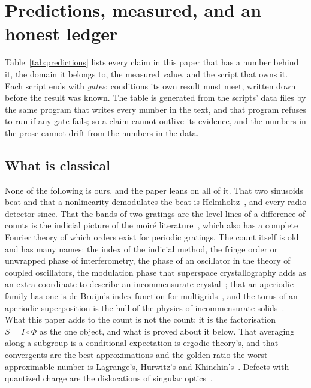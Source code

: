 \section{Predictions, measured, and an honest ledger}
\label{sec:ledger}

Table~\ref{tab:predictions} lists every claim in this paper that has a
number behind it, the domain it belongs to, the measured value, and the
script that owns it. Each script ends with \emph{gates}: conditions its
own result must meet, written down before the result was known. The table
is generated from the scripts' data files by the same program that writes
every number in the text, and that program refuses to run if any gate
fails; so a claim cannot outlive its evidence, and the numbers in the prose
cannot drift from the numbers in the data.

\begin{table}[t]
  \centering\small
  
  \caption{ ``Any'' means the
  claim is about pictures on a torus and holds for drawings, sounds and
  anything else that counts; ``drawing'', ``sound'' and ``a strobe'' are the
  domains in which it was measured, on drawn strokes, on a model ear, and on
  sampled frames; ``a camera'' is the long exposure; ``instrument''
  certifies the tool. No claim without a number; no number without a
  script.}
  \label{tab:predictions}
\end{table}

\subsection{What is classical}
None of the following is ours, and the paper leans on all of it. That two
sinusoids beat and that a nonlinearity demodulates the beat is
Helmholtz~\cite{Helmholtz1954Sensations}, and every radio detector since.
That the bands of two gratings are the level lines of a difference of
counts is the indicial picture of the moir\'e
literature~\cite{Oster1964, Amidror2009Theory}, which also has a complete
Fourier theory of which orders exist for periodic gratings. The count itself
is old and has many names: the index of the indicial method, the fringe
order or unwrapped phase of interferometry, the phase of an oscillator in
the theory of coupled oscillators, the modulation phase that superspace
crystallography adds as an extra coordinate to describe an incommensurate
crystal~\cite{deWolff1974Modulated}; that an aperiodic family has one is
de Bruijn's index function for multigrids~\cite{deBruijn1981Penrose}, and
the torus of an aperiodic superposition is the hull of the physics of
incommensurate solids~\cite{Bellissard2000Hulls}. What this paper adds
to the count is not the count: it is the factorisation $S=I\circ\Phi$ as
the one object, and what is proved about it below. That averaging along a subgroup is a
conditional expectation is ergodic theory's, and that convergents are the
best approximations and the golden ratio the worst approximable number is
Lagrange's, Hurwitz's and Khinchin's~\cite{Hurwitz1891Annaherung,
Khinchin1964Continued}. Defects with quantized charge are the dislocations
of singular optics~\cite{NyeBerry1974Dislocations}.

